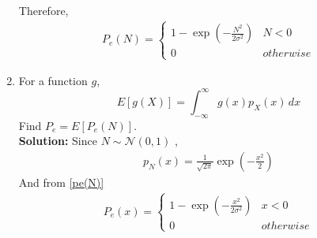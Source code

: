 \documentclass{article}
\numberwithin{equation}{subsection}
\numberwithin{figure}{subsection}
\providecommand{\brak}[1]{\ensuremath{\left(#1\right)}}
\providecommand{\sbrak}[1]{\ensuremath{{}\left[#1\right]}}
\providecommand{\gauss}[2]{\mathcal{N}\ensuremath{\left(#1,#2\right)}}
\newcommand{\solution}{\noindent \textbf{Solution: }}
\renewcommand\thesection{\arabic{section}}
\renewcommand\thesubsection{\thesection.\arabic{subsection}}
\begin{document}
\begin{enumerate}[label=\thesubsection.\arabic*,ref=\thesubsection.\arabic{figure}]
\begin{align}
\end{align}
Therefore,
\begin{align}\label{pe(N)}
P_e(N) = 
\begin{cases}
1-\exp\brak{{-\frac{N^2}{2\sigma^2}}} & N<0\\
0 & otherwise
\end{cases}
\end{align}
%
\item
%
\label{ch4_anal}
For a function $g$,
\begin{equation}
E\sbrak{g(X)} = \int_{-\infty}^{\infty}g(x)p_{X}(x)\, dx
\end{equation}
%
Find $P_e = E\sbrak{P_e(N)}$.
\\
\solution
Since $N \sim \gauss{0}{1}$ ,
\begin{align}
  p_N(x)= \frac{1}{\sqrt{2\pi}}\exp \brak{-\frac{x^2}{2} }
\end{align}
And from \eqref{pe(N)} 
\begin{align}
    P_e(x)=
    \begin{cases}
1-\exp\brak{{-\frac{x^2}{2\sigma^2}}} & x<0\\
0 & otherwise
\end{cases}
\end{align}


\end{enumerate}
\end{document}
